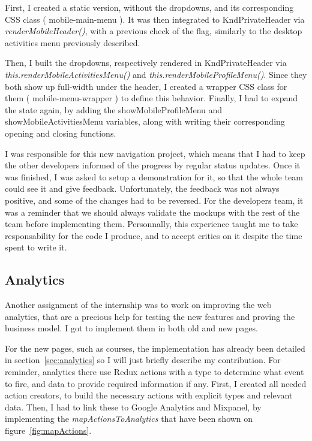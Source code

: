 First, I created a static version, without the dropdowns, and its corresponding CSS class (\guillemotleft{} mobile-main-menu \guillemotright{}). It was then integrated to \guillemotleft{} KndPrivateHeader \guillemotright{} via \textit{renderMobileHeader()}, with a previous check of the flag, similarly to the desktop activities menu previously described.

Then, I built the dropdowns, respectively rendered in \guillemotleft{} KndPrivateHeader \guillemotright{} via \textit{this.renderMobileActivitiesMenu()} and \textit{this.renderMobileProfileMenu()}. Since they both show up full-width under the header, I created a wrapper CSS class for them (\guillemotleft{} mobile-menu-wrapper \guillemotright{}) to define this behavior. Finally, I had to expand the state again, by adding the \guillemotleft{} showMobileProfileMenu \guillemotright{} and \guillemotleft{} showMobileActivitiesMenu \guillemotright{} variables, along with writing their corresponding opening and closing functions. 

I was responsible for this new navigation project, which means that I had to keep the other developers informed of the progress by regular status updates. Once it was finished, I was asked to setup a demonstration for it, so that the whole team could see it and give feedback. Unfortunately, the feedback was not always positive, and some of the changes had to be reversed. For the developers team, it was a reminder that we should always validate the mockups with the rest of the team before implementing them. Personnally, this experience taught me to take responsability for the code I produce, and to accept critics on it despite the time spent to write it.

\subsection{Analytics}
\label{ssec:analytics}

Another assignment of the internship was to work on improving the web analytics, that are a precious help for testing the new features and proving the business model. I got to implement them in both old and new pages.

For the new pages, such as courses, the implementation has already been detailed in {\sc section}~\ref{sec:analytics} so I will just briefly describe my contribution. For reminder, analytics there use Redux actions with a type to determine what event to fire, and data to provide required information if any. First, I created all needed action creators, to build the necessary actions with explicit types and relevant data. Then, I had to link these to Google Analytics and Mixpanel, by implementing the \textit{mapActionsToAnalytics} that have been shown on {\sc figure}~\ref{fig:mapActions}. 

